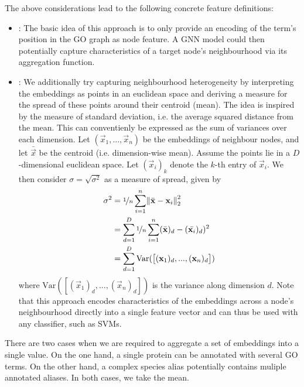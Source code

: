 \documentclass[
	fontsize=10pt, %
	twoside=false, %
	secnumdepth=1, %
  toc=indentunnumbered %
]{kaobook}
\begin{document}
The above considerations lead to the following concrete feature definitions:
\begin{itemize}
\item {}: The basic idea of this approach is to only provide an
  encoding of the term's position in the GO graph as node feature. A GNN model
  could then potentially capture characteristics of a target node's
  neighbourhood via its aggregation function.
\item {}: We additionally try capturing neighbourhood
  heterogeneity by interpreting the embeddings as points in an euclidean space
  and deriving a measure for the spread of these points around their centroid
  (mean). The idea is inspired by the measure of standard deviation, i.e. the
  average squared distance from the mean. This can conventienly be expressed as
  the sum of variances over each dimension. Let $(\vec x_1, ..., \vec x_n)$ be
  the embeddings of neighbour nodes, and let $\bar{\vec x}$ be the centroid
  (i.e. dimension-wise mean). Assume the points lie in a $D$-dimensional
  euclidean space. Let $(\vec x_i)_k$ denote the $k$-th entry of $\vec x_i$. We
  then consider $\sigma = \sqrt{\sigma^2}$ as a measure of spread, given by
  \begin{align*}
    \sigma^2 &= \nicefrac{1}{n} \sum_{i=1}^n \norm{\bar{\mathbf{x}} - \mathbf{x}_i}_2^2 \\
             &= \sum_{d=1}^D \nicefrac{1}{n} \sum_{i=1}^n
               (\bar{\mathbf{x}})_d - (\bar{\mathbf{x}_i})_d)^2 \\
             &= \sum_{d=1}^D \text{Var}(\left[
               (\mathbf{x}_1)_d, ..., (\mathbf{x}_n)_d
               \right])
  \end{align*}
  where $\text{Var}(\left[(\vec x_1)_d, ..., (\vec x_n)_d \right])$ is the
  variance along dimension $d$.
  Note that this approach encodes characteristics of the embeddings across a
  node's neighbourhood directly into a single feature vector and can thus be
  used with any classifier, such as SVMs.
\end{itemize}


There are two cases when we are required to
aggregate a set of embeddings into a single value. On the one hand, a single
protein can be annotated with several GO terms. On the other hand, a complex
species alias potentially contains muliple annotated aliases. In both cases,
we take the mean.


\end{document}
